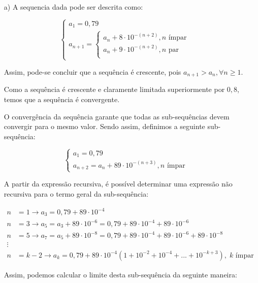\documentclass[12pt,a4paper]{article}
\begin{document}
\begin{itemize}
    \item[a)] A sequencia dada pode ser descrita como:
    
    $$
    \begin{cases}
    a_1 = 0,79 \\
    a_{n+1} =
        \begin{cases}
        a_n + 8 \cdot 10^{-(n+2)}, \text{$n$ ímpar} \\
        a_n + 9 \cdot 10^{-(n+2)}, \text{$n$ par} \\
        \end{cases}  
    \end{cases}
    $$
    
    Assim, pode-se concluir que a sequência é crescente, pois $a_{n+1} > a_n, \forall n \geq 1$. 
    
    Como a sequência é crescente e claramente limitada superiormente por $0,8$, temos que a sequência é convergente.
    
    O convergência da sequência garante que todas as sub-sequências devem convergir para o mesmo valor. Sendo assim, definimos a seguinte sub-sequência:
    
    $$
    \begin{cases}
    a_1 = 0,79 \\
    a_{n+2} =  a_n + 89 \cdot 10^{-(n+3)}, \text{$n$ ímpar}
    \end{cases}
    $$
    
    A partir da expressão recursiva, é possível determinar uma expressão não recursiva para o termo geral da sub-sequência:
    
    \begin{align*} 
    n &= 1 \rightarrow a_3 = 0,79 + 89 \cdot 10^{-4} \\ 
    n &= 3 \rightarrow a_5 = a_3 + 89 \cdot 10^{-6} = 0,79 + 89 \cdot 10^{-4} + 89 \cdot 10^{-6} \\
    n &= 5 \rightarrow a_7 = a_5 + 89 \cdot 10^{-8} = 0,79 + 89 \cdot 10^{-4} + 89 \cdot 10^{-6} + 89 \cdot 10^{-8}\\
    \vdots \\
    n &= k-2 \rightarrow a_k = 0,79 + 89 \cdot 10^{-4}(1 + 10^{-2} + 10^{-4} + ... + 10^{-k+3}), \; \text{$k$ ímpar}
    \end{align*}
    
    Assim, podemos calcular o limite desta sub-sequência da seguinte maneira:
    

\end{itemize}
\end{document}
